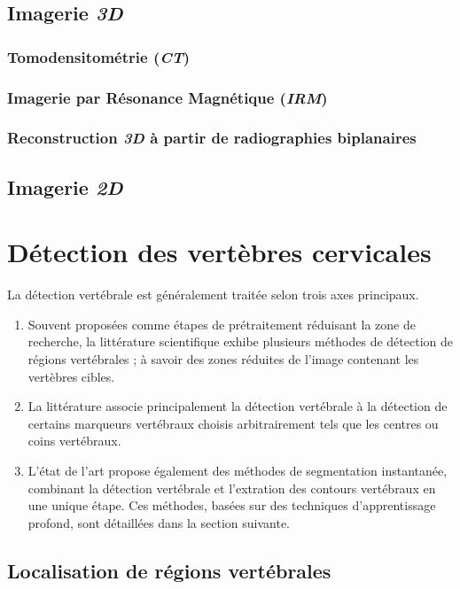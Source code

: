     \subsection{Imagerie {\itshape 3D}}
        \subsubsection{Tomodensitométrie ({\itshape CT})}
        \subsubsection{Imagerie par Résonance Magnétique ({\itshape IRM})}
        \subsubsection{Reconstruction {\itshape 3D} à partir de radiographies biplanaires}
    \subsection{Imagerie {\itshape 2D}}


\section{Détection des vertèbres cervicales}

    La détection vertébrale est généralement traitée selon trois axes principaux.
    \begin{enumerate}
        \item Souvent proposées comme étapes de prétraitement réduisant la zone de recherche, la littérature scientifique exhibe plusieurs méthodes de détection de régions vertébrales ; à savoir des zones réduites de l'image contenant les vertèbres cibles.
        \item La littérature associe principalement la détection vertébrale à la détection de certains marqueurs vertébraux choisis arbitrairement tels que les centres ou coins vertébraux.
        \item L'état de l'art propose également des méthodes de segmentation instantanée, combinant la détection vertébrale et l'extration des contours vertébraux en une unique étape. Ces méthodes, basées sur des techniques d'apprentissage profond, sont détaillées dans la section suivante.
        \\
    \end{enumerate}

    \subsection{Localisation de régions vertébrales}

